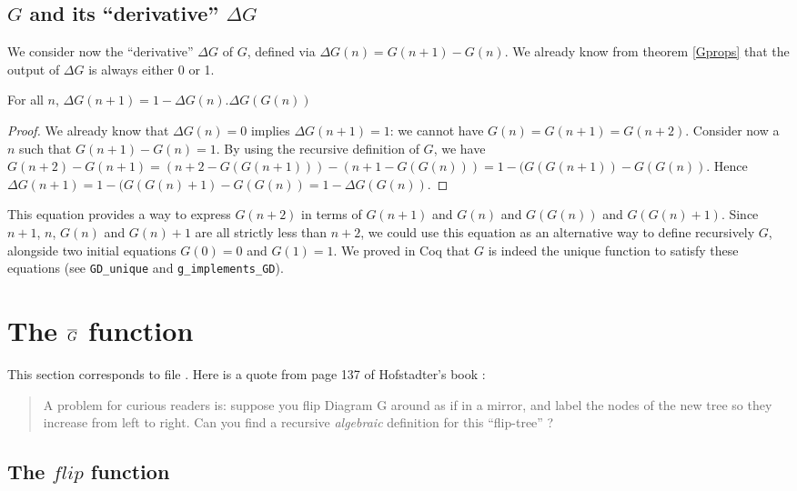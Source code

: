 \documentclass[a4paper,11pt]{article}
\begin{document}
\subsection{$G$ and its ``derivative'' $\Delta G$}
\label{deltaG}

We consider now the ``derivative'' $\Delta G$ of $G$, defined via
$\Delta G(n) = G(n+1)-G(n)$. We already know from theorem
\ref{Gprops} that the output of $\Delta G$ is always either 0 or 1.

\begin{theorem}\label{Gdelta}
For all $n$, $\Delta G(n+1) = 1 - \Delta G(n).\Delta G(G(n))$
\end{theorem}
\begin{proof}
We already know that $\Delta G(n)=0$ implies $\Delta G(n+1)=1$:
we cannot have $G(n)=G(n+1)=G(n+2)$.
Consider now a $n$ such that
$G(n+1)-G(n)=1$. By using the recursive definition of $G$, we have
$G(n+2)-G(n+1)=(n+2-G(G(n+1)))-(n+1-G(G(n))) = 1 - (G(G(n+1))-G(G(n))$.
Hence $\Delta G(n+1) = 1 - (G(G(n)+1)-G(G(n)) = 1 - \Delta G(G(n))$.
\end{proof}

This equation provides a way to express $G(n+2)$ in terms of
$G(n+1)$ and $G(n)$ and $G(G(n))$ and $G(G(n)+1)$. Since
$n+1$, $n$, $G(n)$ and $G(n)+1$ are all strictly less than $n+2$,
we could use this equation as an alternative way to define
recursively $G$,
alongside two initial equations $G(0)=0$ and $G(1)=1$.
We proved in Coq that $G$ is indeed the unique function to
satisfy these equations (see {\tt GD\_unique} and
{\tt  g\_implements\_GD}).

\section{The $\overline{G}$ function}

This section corresponds to file .
Here is a quote from page 137 of Hofstadter's book \cite{GEB}:
\begin{quote}
A problem for curious readers is: suppose you flip Diagram G
around as if in a mirror, and label the nodes of the new tree so they
increase from left to right. Can you find a recursive \emph{algebraic}
definition for this ``flip-tree'' ?
\end{quote}

\subsection{The $flip$ function}
\end{document}

